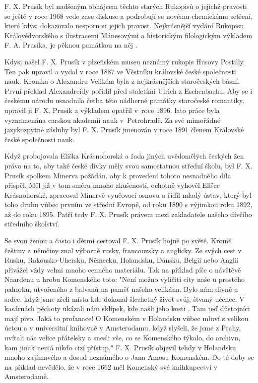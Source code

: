 \documentclass[../dejiny-rodu-prusiku.tex]{subfiles}
\begin{document}
F. X. Prusík byl nadšeným obhájcem těchto starých Rukopisů o jejichž pravosti se ještě v roce 1968 vede zase dis­kuse a podrobují se novému chemickému setření, které kdysi dokazovalo nespornou jejich pravost. Nejkrásnější vydání Rukopisu Královédvorského s ilustracemi Máneso­vými a historickým filologickým výkladem F. A. Prusíka, je pěknou památkou na něj .

Kdysi našel F. X. Prusík v plzeňském museu neznámý ruko­pis Husovy Postilly. Ten pak upravil a vydal v roce 1887 ve Věstníku královské české společnosti nauk. Kronika o Alexandru Velikém byla z nejkrásnějších staročeských básní. První překlad Alexandreidy pořídil před staletími Ulrich z Eschenbachu. Aby se i českému národu usnadnila četba této nádherné památky staročeské roman­tiky, upravil ji F. X. Prusik a výkladem opatřil v roce 1896. lato práce byla vyznamenána carskou akademií nauk v Petrohradě. Za své mimořádné jazykozpytné zásluhy byl F. X. Prusík jmen­ován v roce 1891 členem Královské české společnosti nauk.

Když probojovala Eliška Krásnohorská a řada jiných uvě­domělých českých žen právo na to, aby také české dívky
měly svou samostatnou střední školu, byl F. X. Prusík spolkem Minerva požádán, aby k provedení tohoto nesnad­ného díla přispěl. Měl již v tom směru mnoho zkušeností, ochotně vyhověl Elišce Krásnohorské, zpracoval Minervě vyučovací osnovu a řídil mladý ústav, který byl toho druhu vůbec prvním ve střední Evropě, od roku 1890 s výjimkou roku 1892, až do roku 1895. Patří tedy F. X. Prusík právem mezi zakladatele našeho dívčího středního školství.

Se svou ženou a často i dětmi cestoval F. X. Prusík hojně po světě. Kromě češtiny a němčiny znal výborně rusky, francouzsky a anglicky. Ze svých cest v Rusku, Rakousko-Uhersku, Německu, Holandsku, Dánsku, Belgii nebo Anglii přivážel vždy velmi mnoho cenného materiálu. Tak na příklad píše o návštěvě Naardenu u hrobu Komenského toto:  "Není možno vylíčiti city naše u prostého pahorku, utvo­řeného z balvanů na paměť našeho velikána. Bylo nám divně u srdce, když jsme zřeli místa kde dokonal šle­chetný život svůj, štvaný učenec. V kasárnách pěchoty ukázali nám sklípek, kde našli jeho kosti . Tam teď důstojníci mají pivo. Jaká to profanace! O Komenském v Holandsku vůbec mluví s velikou úctou a v universitní kni­hovně v Amsterodamu, když slyšeli, že jsme z Prahy, uvítali nás velice přátelsky a snesli vše, co se Komenského týkalo, do archivu, kam jinak nemá nikdo cizí přístup." F. X. Prusík objevil tehdy v Holandsku mnoho zajímavého a dosud neznámého o Janu Amosu Komenském. Do té doby se na příklad nevědělo, že v roce 1662 měl Komenský své knihkupectví v Amsterodamě.
\end{document}
